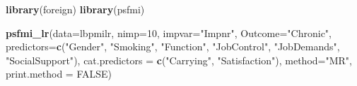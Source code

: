 \documentclass[]{book}
\newenvironment{Shaded}{\begin{snugshade}}{\end{snugshade}}
\newcommand{\KeywordTok}[1]{\textcolor[rgb]{0.13,0.29,0.53}{\textbf{#1}}}
\newcommand{\DataTypeTok}[1]{\textcolor[rgb]{0.13,0.29,0.53}{#1}}
\newcommand{\DecValTok}[1]{\textcolor[rgb]{0.00,0.00,0.81}{#1}}
\newcommand{\StringTok}[1]{\textcolor[rgb]{0.31,0.60,0.02}{#1}}
\newcommand{\OtherTok}[1]{\textcolor[rgb]{0.56,0.35,0.01}{#1}}
\newcommand{\NormalTok}[1]{#1}
\begin{document}
\begin{Shaded}
\begin{Highlighting}[]
\KeywordTok{library}\NormalTok{(foreign)}
\KeywordTok{library}\NormalTok{(psfmi)}

\KeywordTok{psfmi_lr}\NormalTok{(}\DataTypeTok{data=}\NormalTok{lbpmilr, }\DataTypeTok{nimp=}\DecValTok{10}\NormalTok{, }\DataTypeTok{impvar=}\StringTok{"Impnr"}\NormalTok{, }\DataTypeTok{Outcome=}\StringTok{"Chronic"}\NormalTok{,}
  \DataTypeTok{predictors=}\KeywordTok{c}\NormalTok{(}\StringTok{"Gender"}\NormalTok{, }\StringTok{"Smoking"}\NormalTok{, }\StringTok{"Function"}\NormalTok{, }\StringTok{"JobControl"}\NormalTok{, }\StringTok{"JobDemands"}\NormalTok{,}
  \StringTok{"SocialSupport"}\NormalTok{), }\DataTypeTok{cat.predictors =} \KeywordTok{c}\NormalTok{(}\StringTok{"Carrying"}\NormalTok{, }\StringTok{"Satisfaction"}\NormalTok{), }
  \DataTypeTok{method=}\StringTok{"MR"}\NormalTok{, }\DataTypeTok{print.method =} \OtherTok{FALSE}\NormalTok{)}
\end{Highlighting}
\end{Shaded}
\end{document}
